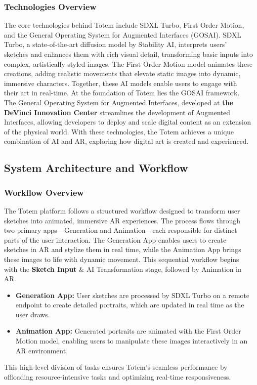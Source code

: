 \subsubsection{Technologies Overview}
The core technologies behind Totem include SDXL Turbo\cite{sauer2023adversarial}, First Order Motion\cite{Siarohin_2019_NeurIPS}, and the General Operating System for Augmented Interfaces (GOSAI)\cite{gosai2022}.
SDXL Turbo, a state-of-the-art diffusion model by Stability AI, interprets users' sketches and enhances them with rich visual detail, transforming basic inputs into complex, artistically styled images.
The First Order Motion model animates these creations, adding realistic movements that elevate static images into dynamic, immersive characters.
Together, these AI models enable users to engage with their art in real-time.
At the foundation of Totem lies the GOSAI framework. The General Operating System for Augmented Interfaces, developed at \textbf{the DeVinci Innovation Center} streamlines the development of Augmented Interfaces, allowing developers to deploy and scale digital content as an extension of the physical world.
With these technologies, the Totem achieves a unique combination of AI and AR, exploring how digital art is created and experienced.

\subsection{ System Architecture and Workflow}

\subsubsection{Workflow Overview}
The Totem platform follows a structured workflow designed to transform user sketches into animated, immersive AR experiences.
The process flows through two primary apps—Generation and Animation—each responsible for distinct parts of the user interaction.
The Generation App enables users to create sketches in AR and stylize them in real time, while the Animation App brings these images to life with dynamic movement.
This sequential workflow begins with the \textbf{Sketch Input} \& AI Transformation stage, followed by Animation in AR.

\begin{itemize}
    \item \textbf{Generation App:} User sketches are processed by SDXL Turbo on a remote endpoint to create detailed portraits, which are updated in real time as the user draws.
    \item  \textbf{Animation App:} Generated portraits are animated with the First Order Motion model, enabling users to manipulate these images interactively in an AR environment.
\end{itemize}
This high-level division of tasks ensures Totem’s seamless performance by offloading resource-intensive tasks and optimizing real-time responsiveness.

